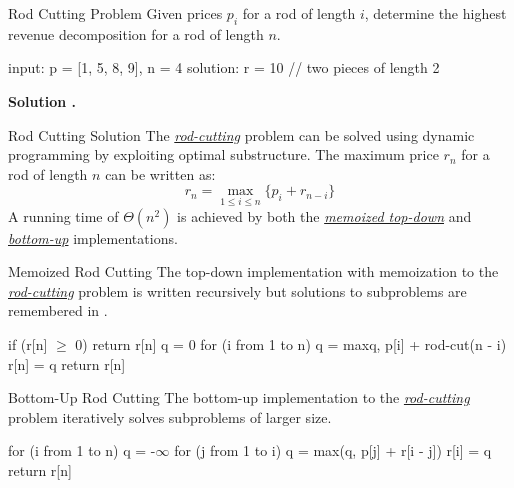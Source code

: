 \documentclass{cognito}
\begin{document}
\begin{note}{Rod Cutting Problem}
	Given prices $p_i$ for a rod of length $i$, determine the highest revenue decomposition for
	a rod of length $n$.
	\begin{largecode}
 input:    p = [1, 5, 8, 9], n = 4
 solution: r = 10  // two pieces of length 2
	\end{largecode}
	\bf Solution \hyperref[note:Rod Cutting Solution]{\solutionref}.
\end{note}

\begin{note}{Rod Cutting Solution}
	The \hyperref[note:Rod Cutting Problem]{\it rod-cutting} problem can be solved using dynamic programming
	by exploiting optimal substructure.
	The maximum price $r_n$ for a rod of length $n$ can be written as:
	$$ r_n = \max_{1 \leq i \leq n} \{ p_i + r_{n-i} \} $$
	A running time of $\Theta(n^2)$ is achieved by both the \hyperref[note:Memoized Rod Cutting]{\it memoized top-down} and
	\hyperref[note:Bottom-Up Rod Cutting]{\it bottom-up} implementations.
	
\end{note}

\begin{note}{Memoized Rod Cutting}
	The top-down implementation  with memoization to the \hyperref[note:Rod Cutting Problem]{\it rod-cutting} problem
	 is written recursively but solutions to subproblems are remembered in .
	 
	 \begin{largecode}
 if (r[n] $\geq$ 0) return r[n]
 q = 0
 for (i from 1 to n)
	q = max{q, p[i] + rod-cut(n - i)}
 r[n] = q
 return r[n]
	\end{largecode}
	\vspace{-5pt}
\end{note}

\begin{note}{Bottom-Up Rod Cutting}
	The bottom-up implementation  to the \hyperref[note:Rod Cutting Problem]{\it rod-cutting} problem
	 iteratively solves subproblems of larger size. 
	 
	 \begin{largecode}
 for (i from 1 to n)
 	q = -$\infty$
	for (j from 1 to i)
		q = max(q, p[j] + r[i - j])
	r[i] = q
 return r[n]
	\end{largecode}
	\vspace{-5pt}
\end{note}
\end{document}
